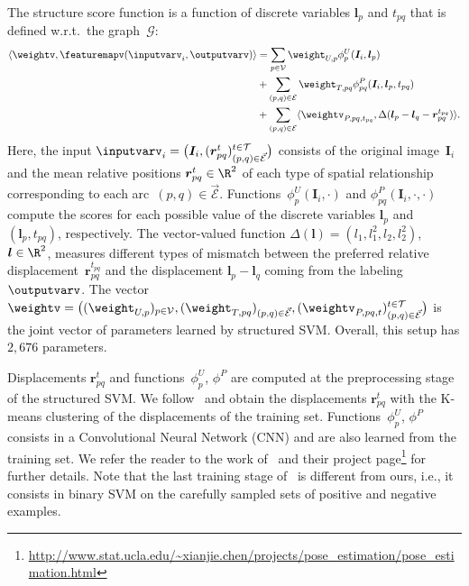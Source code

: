 \documentclass{article}
\begin{document}
The structure score function is a function of discrete variables $\bm{l}_p$ and $t_{pq}$ that is defined w.r.t.\ the graph~$\mathcal{G}$:
\begin{align*}
\langle \weightv, \featuremapv(\inputvarv_i,\outputvarv) \rangle
&=
\sum_{p \in \mathcal{V}} \weight_{U,p} \phi^U_p( \bm{I}_i, \bm{l}_p ) \\
&+
\sum_{(p,q) \in \mathcal{E}} 
\weight_{T,pq}
\phi^P_{pq}(  \bm{I}_i, \bm{l}_p, t_{pq} )
\\
&+
\sum_{(p,q) \in \mathcal{E}} 
\langle \weightv_{P,pq, t_{pq}},
\Delta( \bm{l}_p - \bm{l}_q - \bm{r}_{pq}^{t_{pq}})\rangle.
\end{align*}
Here, the input
$
\inputvarv_i = \bigl(  \bm{I}_i, (\bm{r}_{pq}^{t})_{(p,q) \in \vec{\mathcal{E}}}^{t\in \mathcal{T}} \bigr)
$
consists of the original image~$\bm{I}_i$ and the mean relative positions $\bm{r}_{pq}^{t} \in \R^2$ of each type of spatial relationship corresponding to each arc~$(p,q) \in \vec{\mathcal{E}}$.
Functions~$\phi^U_p(\bm{I}_i, \cdot)$ and $\phi^P_{pq}(\bm{I}_i, \cdot, \cdot)$ compute the scores for each possible value of the discrete variables $\bm{l}_p$ and $(\bm{l}_p,t_{pq})$, respectively.
The vector-valued function $\Delta(\bm{l}) = (l_1, l_1^2, l_2, l_2^2)$, $\bm{l} \in \R^2$, measures different types of mismatch between the preferred relative displacement~$\bm{r}_{pq}^{t_{pq}}$ and the displacement $\bm{l}_p - \bm{l}_q$ coming from the labeling~$\outputvarv$.
The vector~$\weightv = \bigl(  (\weight_{U,p})_{p \in \mathcal{V}}, (\weight_{T,pq})_{(p,q)\in \vec{\mathcal{E}}}, (\weightv_{P,pq, t})_{(p,q)\in \vec{\mathcal{E}}}^{t \in \mathcal{T}} \bigr)$ is the joint vector of parameters learned by structured SVM. Overall, this setup has $2,676$ parameters.

Displacements $\bm{r}_{pq}^{t}$ and functions~$\phi^U_p$, $\phi^P$ are computed at the preprocessing stage of the structured SVM.
We follow~\citet{Chen_NIPS14} and obtain the displacements $\bm{r}_{pq}^{t}$ with the K-means clustering of the displacements of the training set. Functions~$\phi^U_p$, $\phi^P$ consists in a Convolutional Neural Network (CNN) and are also learned from the training set. We refer the reader to the work of~\citet{Chen_NIPS14} and their project page\footnote{\url{http://www.stat.ucla.edu/~xianjie.chen/projects/pose_estimation/pose_estimation.html}} for further details.
Note that the last training stage of~\citet{Chen_NIPS14} is different from ours, i.e., it consists in binary SVM on the carefully sampled sets of positive and negative examples. 
\end{document}
